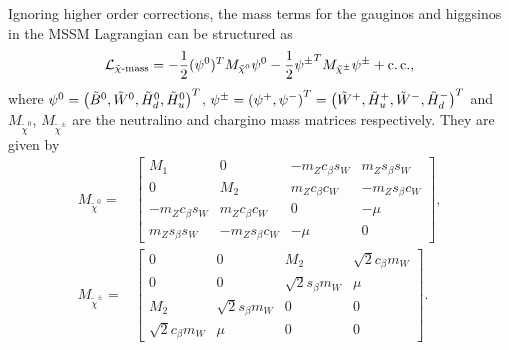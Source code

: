 \documentclass[../main.tex]{subfiles}
\begin{document}
Ignoring higher order corrections, the mass terms for the gauginos and higgsinos in the MSSM Lagrangian can be structured as
\begin{equation}
  \mathcal{L}_{\tilde\chi\text{-mass}} = -\frac{1}{2}(\psi^0)^T M_{\tilde\chi^0} \psi^0 - \frac{1}{2}{\psi^\pm}^T M_{\tilde\chi^\pm} \psi^\pm + \operatorname{c.c.},
\end{equation}
where \(\psi^0 = \left(\tilde{B}^0, \tilde{W}^0, \tilde{H}^0_d, \tilde{H}^0_u\right)^T\), \(\psi^\pm = \left(\psi^+, \psi^-\right)^T = \left(\tilde{W}^+, \tilde{H}_u^+, \tilde{W}^-, \tilde{H}_d^-\right)^T\) and \(M_{\tilde\chi^0}\), \(M_{\tilde\chi^\pm}\) are the neutralino and chargino mass matrices respectively.
They are given by
\begin{align}
  M_{\tilde\chi^0} =   & \begin{bmatrix}
                           M_1              & 0                & -m_Z c_\beta s_W & m_Z s_\beta s_W  \\
                           0                & M_2              & m_Z c_\beta c_W  & -m_Z s_\beta c_W \\
                           -m_Z c_\beta s_W & m_Z c_\beta c_W  & 0                & -\mu             \\
                           m_Z s_\beta s_W  & -m_Z s_\beta c_W & -\mu             & 0
                         \end{bmatrix},             \\
  M_{\tilde\chi^\pm} = & \begin{bmatrix}
                           0                   & 0                   & M_2                 & \sqrt{2}c_\beta m_W \\
                           0                   & 0                   & \sqrt{2}s_\beta m_W & \mu                 \\
                           M_2                 & \sqrt{2}s_\beta m_W & 0                   & 0                   \\
                           \sqrt{2}c_\beta m_W & \mu                 & 0                   & 0
                         \end{bmatrix}.
\end{align}
\end{document}
